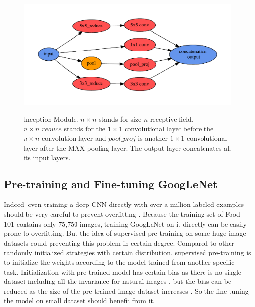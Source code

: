 \begin{figure}
  \centering
  \includegraphics[scale=.45]{fig/inception.pdf}\\
  \caption{Inception Module. $n\times n$ stands for size $n$ receptive field, $n\times n\_reduce$ stands for the $1\times 1$ convolutional layer before the $n\times n$ convolution layer and $pool\_proj$ is another $1\times 1$ convolutional layer after the MAX pooling layer. The output layer concatenates all its input layers.}\label{incept}
\end{figure}

\subsection{Pre-training and Fine-tuning GoogLeNet}
Indeed, even training a deep CNN directly with over a million labeled examples should be very careful to prevent overfitting \cite{krizhevsky2012imagenet}.
Because the training set of Food-101 contains only 75,750 images, training GoogLeNet on it directly can be easily prone to overfitting. But the idea of supervised pre-training on some huge image datasets could preventing this problem in certain degree. Compared to other randomly initialized strategies with certain distribution, supervised pre-training is to initialize the weights according to the model trained from another specific task. Initialization with pre-trained model has certain bias as there is no single dataset including all the invariance for natural images , but the bias can be reduced as the size of the pre-trained image dataset increases \cite{agrawal2014analyzing}. So the fine-tuning the model on small dataset should benefit from it.

